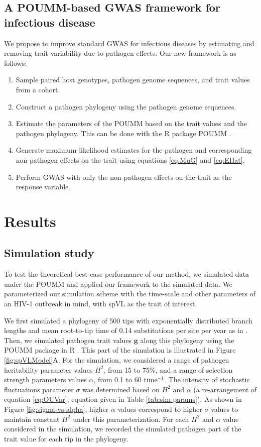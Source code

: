 \documentclass[11pt]{article}
\begin{document}
\begin{linenumbers}
\subsection*{A POUMM-based GWAS framework for infectious disease}

We propose to improve standard GWAS for infectious diseases by estimating and removing trait variability due to pathogen effects. Our new framework is as follows:

\begin{enumerate}
	\item Sample paired host genotypes, pathogen genome sequences, and trait values from a cohort.
	\item Construct a pathogen phylogeny using the pathogen genome sequences.
	\item Estimate the parameters of the POUMM based on the trait values and the pathogen phylogeny. This can be done with the R package POUMM \citep{Mitov2017a-POUMM}.
	\item Generate maximum-likelihood estimates for the pathogen and corresponding non-pathogen effects on the trait using equations \ref{eq:MuG} and \ref{eq:EHat}.
	\item Perform GWAS with only the non-pathogen effects on the trait as the response variable.
\end{enumerate}

\section*{Results}

\subsection*{Simulation study}

To test the theoretical best-case performance of our method, we simulated data under the POUMM and applied our framework to the simulated data. We parameterized our simulation scheme with the time-scale and other parameters of an HIV-1 outbreak in mind, with spVL as the trait of interest. 

We first simulated a phylogeny of 500 tips with exponentially distributed branch lengths and mean root-to-tip time of 0.14 substitutions per site per year as in \cite{Hodcroft2014}. Then, we simulated pathogen trait values $\bm{g}$ along this phylogeny using the POUMM package in R \citep{Mitov2017a-POUMM}. This part of the simulation is illustrated in Figure \ref{fig:spVLModel}A. For the simulation, we considered a range of pathogen heritability parameter values $H^2$, from 15 to 75\%, and a range of selection strength parameters values $\alpha$, from 0.1 to 60 time$^{-1}$. The intensity of stochastic fluctuations parameter $\sigma$ was determined based on $H^2$ and $\alpha$ (a re-arrangement of equation \ref{eq:OUVar}, equation given in Table \ref{tab:sim-params}). As shown in Figure \ref{fig:sigma-vs-alpha}, higher $\alpha$ values correspond to higher $\sigma$ values to maintain constant $H^2$ under this parameterization. For each $H^2$ and $\alpha$ value considered in the simulation, we recorded the simulated pathogen part of the trait value for each tip in the phylogeny.


\end{linenumbers}
\end{document}
